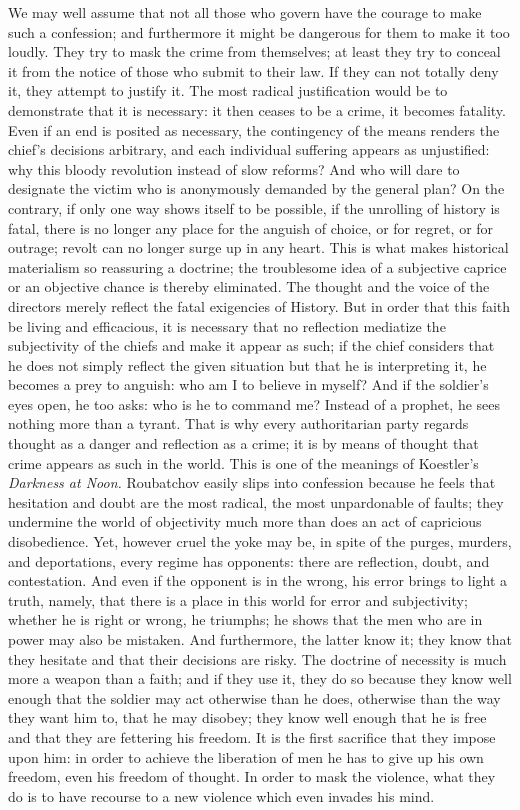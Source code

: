 \documentclass[11pt]{article}
\begin{document}
{{We may well assume that not all those who govern have the courage to make such a confession; and furthermore it might be dangerous for them to make it too loudly. They try to mask the crime from themselves; at least they try to conceal it from the notice of those who submit to their law. If they can not totally deny it, they attempt to justify it. The most radical justification would be to demonstrate that it is necessary: it then ceases to be a crime, it becomes fatality. Even if an end is posited as necessary, the contingency of the means renders the chief’s decisions arbitrary, and each individual suffering appears as unjustified: why this bloody revolution instead of slow reforms? And who will dare to designate the victim who is anonymously demanded by the general plan? On the contrary, if only one way shows itself to be possible, if the unrolling of history is fatal, there is no longer any place for the anguish of choice, or for regret, or for outrage; revolt can no longer surge up in any heart. This is what makes historical materialism so reassuring a doctrine; the troublesome idea of a subjective caprice or an objective chance is thereby eliminated. The thought and the voice of the directors merely reflect the fatal exigencies of History. But in order that this faith be living and efficacious, it is necessary that no reflection mediatize the subjectivity of the chiefs and make it appear as such; if the chief considers that he does not simply reflect the given situation but that he is interpreting it, he becomes a prey to anguish: who am I to believe in myself? And if the soldier’s eyes open, he too asks: who is he to command me? Instead of a prophet, he sees nothing more than a tyrant. That is why every authoritarian party regards thought as a danger and reflection as a crime; it is by means of thought that crime appears as such in the world. This is one of the meanings of Koestler’s \textit{Darkness at Noon. }Roubatchov easily slips into confession because he feels that hesitation and doubt are the most radical, the most unpardonable of faults; they undermine the world of objectivity much more than does an act of capricious disobedience. Yet, however cruel the yoke may be, in spite of the purges, murders, and deportations, every regime has opponents: there are reflection, doubt, and contestation. And even if the opponent is in the wrong, his error brings to light a truth, namely, that there is a place in this world for error and subjectivity; whether he is right or wrong, he triumphs; he shows that the men who are in power may also be mistaken. And furthermore, the latter know it; they know that they hesitate and that their decisions are risky. The doctrine of necessity is much more a weapon than a faith; and if they use it, they do so because they know well enough that the soldier may act otherwise than he does, otherwise than the way they want him to, that he may disobey; they know well enough that he is free and that they are fettering his freedom. It is the first sacrifice that they impose upon him: in order to achieve the liberation of men he has to give up his own freedom, even his freedom of thought. In order to mask the violence, what they do is to have recourse to a new violence which even invades his mind.

}}
\end{document}
